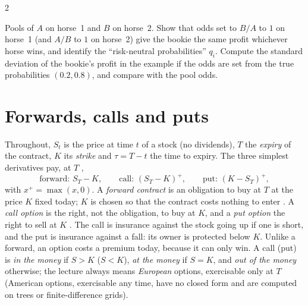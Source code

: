 \begin{paracol}{2}
\begin{exercise}\label{ch15:ex-bookie}
Pools of $A$ on horse~1 and $B$ on horse~2. Show that odds set to $B/A$ to $1$ on horse~1 (and $A/B$ to $1$ on horse~2) give the bookie the same profit whichever horse wins, and identify the ``risk-neutral probabilities'' $q_i$.
Compute the standard deviation of the bookie's profit in the example if the odds are set from the true probabilities $(0.2,0.8)$, and compare with the pool odds.
\end{exercise}

\section{Forwards, calls and puts}\label{ch15:sec-payoffs}
Throughout, $S_t$ is the price at time $t$ of a stock (no dividends), $T$ the \emph{expiry} of the contract, $K$ its
\emph{strike} and $\tau=T-t$ the time to expiry. The three simplest derivatives pay, at $T$ ,
\[
  \text{forward: } S_T-K,\qquad \text{call: } (S_T-K)^+,\qquad \text{put: } (K-S_T)^+ ,
\]
with $x^+=\max(x,0)$. A \emph{forward contract} is an obligation to buy at $T$ at the price $K$ fixed today; $K$ is chosen so that
the contract costs nothing to enter . A \emph{call option} is the right, not the obligation, to
buy at $K$, and a \emph{put option} the right to sell at $K$ . The call is insurance against
the stock going up if one is short, and the put is insurance against a fall: its owner is protected below $K$. Unlike a forward,
an option costs a premium today, because it can only win. A call (put) is \emph{in the money} if $S>K$ ($S<K$), \emph{at the money} if $S=K$, and
\emph{out of the money} otherwise; the lecture always means \emph{European} options, exercisable only at $T$
(American options, exercisable any time, have no closed form and are computed on trees or finite-difference grids).


\end{paracol}
